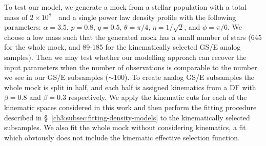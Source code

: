 To test our model, we generate a mock from a stellar population with a total mass of $2\times10^{8}$~\Msun\ and a single power law density profile with the following parameters: $\alpha=3.5$, $p=0.8$, $q=0.5$, $\theta=\pi/4$, $\eta=1/\sqrt{2}$, and $\phi=\pi/6$. We choose a low mass such that the generated mock has a small number of stars (645 for the whole mock, and 89-185 for the kinematically selected GS/E analog samples). Then we may test whether our modelling approach can recover the input parameters when the number of observations is comparable to the number we see in our GS/E subsamples ($\sim 100$). To create analog GS/E subsamples the whole mock is split in half, and each half is assigned kinematics from a DF with $\beta=0.8$ and $\beta=0.3$ respectively. We apply the kinematic cuts for each of the kinematic spaces considered in this work and then perform the fitting procedure described in \S~\ref{ch3:subsec:fitting-density-models} to the kinematically selected subsamples. We also fit the whole mock without considering kinematics, a fit which obviously does not include the kinematic effective selection function. 

